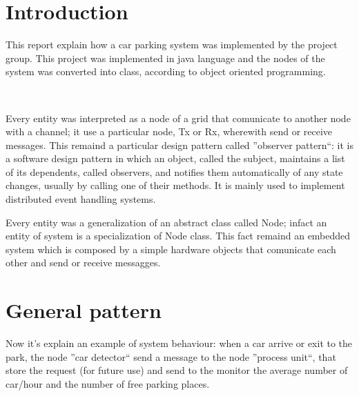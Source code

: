 \documentclass[a4paper,titlepage]{article}
\begin{document}
\begin{frontespizio}


\end{frontespizio}

\tableofcontents

\newpage

\part{Introduction}

This report explain how a car parking system was implemented by the project group. This project was implemented in java language and the nodes of the system was converted into class, according to object oriented programming. 

~

Every entity was interpreted as a node of a grid that comunicate to another node with a channel; it use a particular node, Tx or Rx, wherewith send or receive messages. This remaind a particular design pattern called ''observer pattern``: it is a software design pattern in which an object, called the subject, maintains a list of its dependents, called observers, and notifies them automatically of any state changes, usually by calling one of their methods. It is mainly used to implement distributed event handling systems.

Every entity was a generalization of an abstract class called Node; infact an entity of system is a specialization of Node class. This fact remaind an embedded system which is composed by a simple hardware objects that comunicate each other and send or receive messagges. 

\newpage
\part{General pattern}

Now it's explain an example of system behaviour: when a car arrive or exit to the park, the node ''car detector`` send a message to the node ''process unit``, that store the request (for future use) and send to the monitor the average number of car/hour and the number of free parking places. 
\end{document}
